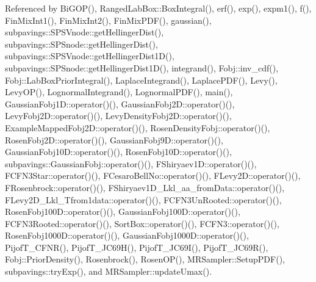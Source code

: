 \-Referenced by \-Bi\-G\-O\-P(), \-Ranged\-Lab\-Box\-::\-Box\-Integral(), erf(), exp(), expm1(), f(), \-Fin\-Mix\-Int1(), \-Fin\-Mix\-Int2(), \-Fin\-Mix\-P\-D\-F(), gaussian(), subpavings\-::\-S\-P\-S\-Vnode\-::get\-Hellinger\-Dist(), subpavings\-::\-S\-P\-Snode\-::get\-Hellinger\-Dist(), subpavings\-::\-S\-P\-S\-Vnode\-::get\-Hellinger\-Dist1\-D(), subpavings\-::\-S\-P\-Snode\-::get\-Hellinger\-Dist1\-D(), integrand(), \-Fobj\-::inv\-\_\-cdf(), \-Fobj\-::\-Lab\-Box\-Prior\-Integral(), \-Laplace\-Integrand(), \-Laplace\-P\-D\-F(), \-Levy(), \-Levy\-O\-P(), \-Lognormal\-Integrand(), \-Lognormal\-P\-D\-F(), main(), \-Gaussian\-Fobj1\-D\-::operator()(), \-Gaussian\-Fobj2\-D\-::operator()(), \-Levy\-Fobj2\-D\-::operator()(), \-Levy\-Density\-Fobj2\-D\-::operator()(), \-Example\-Mapped\-Fobj2\-D\-::operator()(), \-Rosen\-Density\-Fobj\-::operator()(), \-Rosen\-Fobj2\-D\-::operator()(), \-Gaussian\-Fobj9\-D\-::operator()(), \-Gaussian\-Fobj10\-D\-::operator()(), \-Rosen\-Fobj10\-D\-::operator()(), subpavings\-::\-Gaussian\-Fobj\-::operator()(), \-F\-Shiryaev1\-D\-::operator()(), \-F\-C\-F\-N3\-Star\-::operator()(), \-F\-Cesaro\-Bell\-No\-::operator()(), \-F\-Levy2\-D\-::operator()(), \-F\-Rosenbrock\-::operator()(), \-F\-Shiryaev1\-D\-\_\-\-Lkl\-\_\-aa\-\_\-from\-Data\-::operator()(), \-F\-Levy2\-D\-\_\-\-Lkl\-\_\-\-Tfrom1data\-::operator()(), \-F\-C\-F\-N3\-Un\-Rooted\-::operator()(), \-Rosen\-Fobj100\-D\-::operator()(), \-Gaussian\-Fobj100\-D\-::operator()(), \-F\-C\-F\-N3\-Rooted\-::operator()(), \-Sort\-Box\-::operator()(), \-F\-C\-F\-N3\-::operator()(), \-Rosen\-Fobj1000\-D\-::operator()(), \-Gaussian\-Fobj1000\-D\-::operator()(), \-Pijof\-T\-\_\-\-C\-F\-N\-R(), \-Pijof\-T\-\_\-\-J\-C69\-H(), \-Pijof\-T\-\_\-\-J\-C69\-I(), \-Pijof\-T\-\_\-\-J\-C69\-R(), \-Fobj\-::\-Prior\-Density(), \-Rosenbrock(), \-Rosen\-O\-P(), \-M\-R\-Sampler\-::\-Setup\-P\-D\-F(), subpavings\-::try\-Exp(), and \-M\-R\-Sampler\-::update\-Umax().


